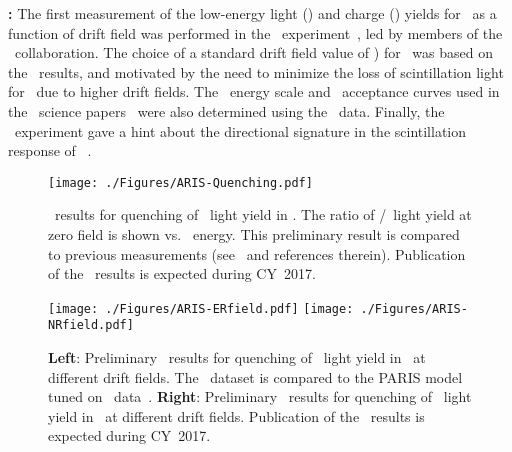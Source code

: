 \begin{compactitem}

\item {\bf \SCENE:} The first measurement of the low-energy light (\SCENERecoilsLightEnergyRange) and charge (\SCENERecoilsIonizationEnergyRange) yields for \NRs\ as a function of drift field was performed in the \SCENE\ experiment~\cite{Alexander:2013ke,Cao:2015ks}, led by members of the \DSs\ collaboration. The choice of a standard drift field value of \DSfDriftField) for \DSfs\ was based on the \SCENE\ results, and motivated by the need to minimize the loss of scintillation light for \NRs\ due to higher drift fields. The \NR\ energy scale and \NR\ acceptance curves used in the \DSfs\ science papers~\cite{Agnes:2015gu,Agnes:2016fz} were also determined using the \SCENE\ data. Finally, the \SCENE\ experiment gave a hint about the directional signature in the scintillation response of \SCENERecoilsEnergyMax\ \NRs.

\begin{figure}[!tb]
\begin{center}
\texttt{[image: ./Figures/ARIS-Quenching.pdf]}
\end{center}
\caption{\ARIS\ results for quenching of \NR\ light yield in \LAr.  The ratio of \NR/\ER\ light yield at zero field is shown vs. \NR\ energy.  This preliminary result is compared to previous measurements (see~\cite{Cao:2015ks} and references therein).  Publication of the \ARIS\ results is expected during CY~2017.}
\label{DSf-ARIS-Leff} 
\end{figure}

\begin{figure}[!htb]
\begin{center}
\texttt{[image: ./Figures/ARIS-ERfield.pdf]}
\texttt{[image: ./Figures/ARIS-NRfield.pdf]}
\end{center}
\caption{{\bf Left}: Preliminary \ARIS\ results for quenching of \ER\ light yield in \LAr\ at different drift fields. The \DSkDriftField\ dataset is compared to the PARIS model tuned on \DSf\ data~\cite{Agnes:2017ug}. {\bf Right}: Preliminary \ARIS\ results for quenching of \NR\ light yield in \LAr\ at different drift fields. Publication of the \ARIS\ results is expected during CY~2017.}
\label{DSf-ARIS-Recombination} 
\end{figure}


\end{compactitem}
